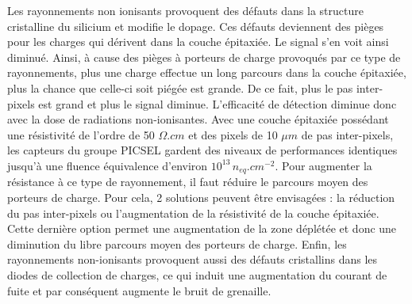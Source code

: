    Les rayonnements non ionisants provoquent des d\'efauts dans la structure cristalline du silicium et modifie le dopage. Ces d\'efauts deviennent des pi\`eges pour les charges qui d\'erivent dans la couche \'epitaxi\'ee. Le signal s'en voit ainsi diminu\'e. Ainsi, \`a cause des pi\`eges \`a porteurs de charge provoqu\'es par ce type de rayonnements, plus une charge effectue un long parcours dans la couche \'epitaxi\'ee, plus la chance que celle-ci soit pi\'eg\'ee est grande. De ce fait, plus le pas inter-pixels est grand et plus le signal diminue. L'efficacit\'e de d\'etection diminue donc avec la dose de radiations non-ionisantes. Avec une couche \'epitaxi\'ee poss\'edant une r\'esistivit\'e de l'ordre de 50 $\Omega.cm$ et des pixels de 10 $\mu m$ de pas inter-pixels, les capteurs du groupe PICSEL gardent des niveaux de performances identiques jusqu'\`a une fluence \'equivalence d'environ $10^{13} \, n_{eq}.cm^{-2}$. Pour augmenter la r\'esistance \`a ce type de rayonnement, il faut r\'eduire le parcours moyen des porteurs de charge. Pour cela, 2 solutions peuvent \^etre envisag\'ees : la réduction du pas inter-pixels ou l'augmentation de la r\'esistivité de la couche \'epitaxi\'ee. Cette dernière option permet une augmentation de la zone d\'epl\'et\'ee et donc une diminution du libre parcours moyen des porteurs de charge. Enfin, les rayonnements non-ionisants provoquent aussi des d\'efauts cristallins dans les diodes de collection de charges, ce qui induit une augmentation du courant de fuite et par cons\'equent augmente le bruit de grenaille.  
   
   

